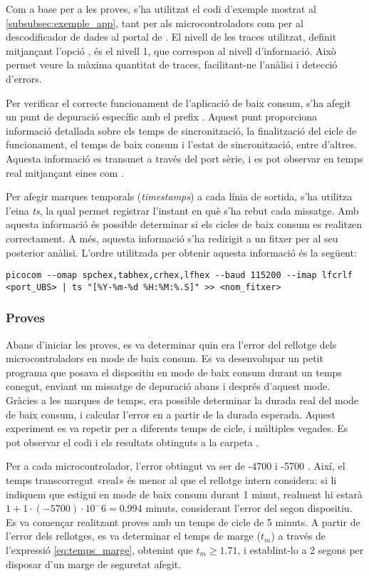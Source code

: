 \documentclass{tfgitic}[2024/07/01]
\begin{document}
{Com a base per a les proves, s'ha utilitzat el codi d'exemple mostrat al \autoref{subsubsec:exemple_app}, tant per als microcontroladors com per al descodificador de dades al portal de . El nivell de les traces utilitzat, definit mitjançant l'opció , és el nivell 1, que correspon al nivell d'informació. Això permet veure la màxima quantitat de traces, facilitant-ne l'anàlisi i detecció d'errors.

Per verificar el correcte funcionament de l'aplicació de baix consum, s'ha afegit un punt de depuració específic amb el prefix . Aquest punt proporciona informació detallada sobre els temps de sincronització, la finalització del cicle de funcionament, el temps de baix consum i l'estat de sincronització, entre d'altres. Aquesta informació es transmet a través del port sèrie, i es pot observar en temps real mitjançant eines com .

Per afegir marques temporals (\emph{timestamps}) a cada línia de sortida, s'ha utilitza l'eina \emph{ts}, la qual permet registrar l'instant en què s'ha rebut cada missatge. Amb aquesta informació és possible determinar si els cicles de baix consum es realitzen correctament. A més, aquesta informació s'ha redirigit a un fitxer per al seu posterior anàlisi. L'ordre utilitzada per obtenir aquesta informació és la següent:

\begin{lstlisting}[style=bashStyle]
picocom --omap spchex,tabhex,crhex,lfhex --baud 115200 --imap lfcrlf <port_UBS> | ts "[%Y-%m-%d %H:%M:%.S]" >> <nom_fitxer>
\end{lstlisting}

\subsubsection{Proves}
Abans d'iniciar les proves, es va determinar quin era l'error del rellotge dels microcontroladors en mode de baix consum. Es va desenvolupar un petit programa que posava el dispositiu en mode de baix consum durant un temps conegut, enviant un missatge de depuració abans i després d'aquest mode. Gràcies a les marques de temps, era possible determinar la durada real del mode de baix consum, i calcular l'error en  a partir de la durada esperada. Aquest experiment es va repetir per a diferents temps de cicle, i múltiples vegades. Es pot observar el codi i els resultats obtinguts a la carpeta .

Per a cada microcontrolador, l'error obtingut va ser de -4700  i -5700 . Així, el temps transcorregut «real» és menor al que el rellotge intern considera: si li indiquem que estigui en mode de baix consum durant 1 minut, realment hi estarà $1+1\cdot (-5700)\cdot10^-6=0.994$ minuts, considerant l'error del segon dispositiu. 
\newline
\newline
Es va començar realitzant proves amb un temps de cicle de 5 minuts. A partir de l'error dels rellotges, es va determinar el temps de marge ($t_m$) a través de l'expressió \ref{eq:temps_marge}, obtenint que $t_m \ge 1.71$, i establint-lo a 2 segons per disposar d'un marge de seguretat afegit. 

}
\end{document}
